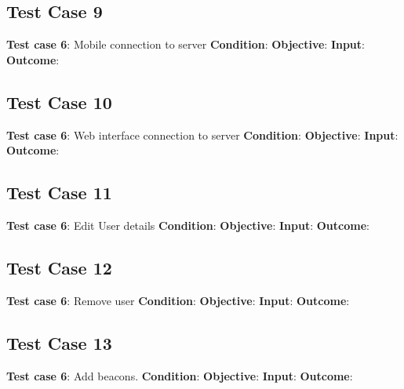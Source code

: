 \documentclass[11pt]{article}
\begin{document}
\subsection{Test Case 9}
\textbf{Test case 6}: Mobile connection to server \newline
\textbf{Condition}:  \newline
\textbf{Objective}:   \newline
\textbf{Input}:  \newline
\textbf{Outcome}:   \newline

\subsection{Test Case 10}
\textbf{Test case 6}: Web interface connection to server \newline
\textbf{Condition}:  \newline
\textbf{Objective}:   \newline
\textbf{Input}:  \newline
\textbf{Outcome}:   \newline

\subsection{Test Case 11}
\textbf{Test case 6}: Edit User details \newline
\textbf{Condition}:  \newline
\textbf{Objective}:   \newline
\textbf{Input}:  \newline
\textbf{Outcome}:   \newline

\subsection{Test Case 12}
\textbf{Test case 6}: Remove user  \newline
\textbf{Condition}:  \newline
\textbf{Objective}:   \newline
\textbf{Input}:  \newline
\textbf{Outcome}:   \newline

\subsection{Test Case 13}
\textbf{Test case 6}: Add beacons. \newline
\textbf{Condition}:  \newline
\textbf{Objective}:   \newline
\textbf{Input}:  \newline
\textbf{Outcome}:   \newline
\end{document}
